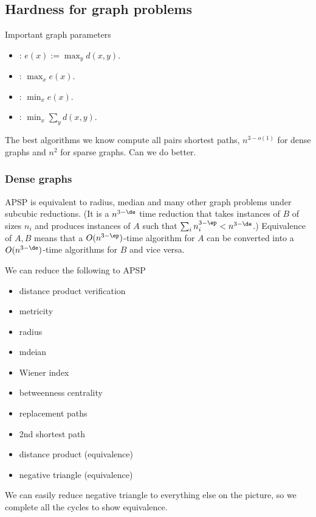 




\subsection{Hardness for graph problems}

Important graph parameters
\begin{itemize}
\item
{}: $e(x):=\max_y d(x,y)$.
\item
{}: $\max_x e(x)$.
\item
{}: $\min_x e(x)$.
\item
{}: $\min_x \sum_y d(x,y)$.
\end{itemize}
The best algorithms we know compute all pairs shortest paths, $n^{3-o(1)}$ for dense graphs and $n^2$ for sparse graphs.
Can we do better.

\subsubsection{Dense graphs}

APSP is equivalent to radius, median and many other graph problems under subcubic reductions. (It is a $n^{3-\de}$ time reduction that takes instances of $B$ of sizes $n_i$ and produces instances of $A$ such that $\sum_i n_i^{3-\ep}< n^{3-\de}$.)
Equivalence of $A,B$ means that a $O(n^{3-\ep})$-time algorithm for $A$ can be converted into a $O(n^{3-\de})$-time algorithms for $B$ and vice versa.


We can reduce the following to APSP
\begin{itemize}
\item
distance product verification
\item metricity
\item radius
\item mdeian
\item Wiener index
\item betweenness centrality
\item replacement paths %
\item 2nd shortest path
\item distance product (equivalence)
\item negative triangle (equivalence)
\end{itemize}
We can easily reduce negative triangle to everything else on the picture, so we complete all the cycles to show equivalence.

